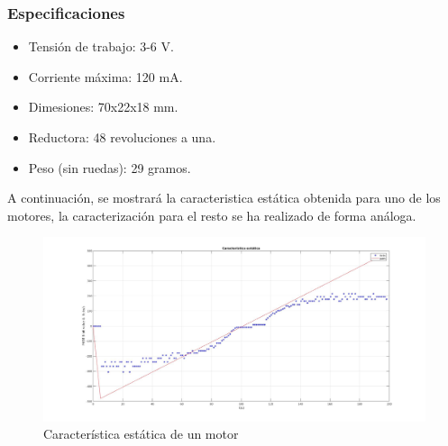 \subsubsection{Especificaciones}
\begin{itemize}
	\item Tensión de trabajo: 3-6 V.
	\item Corriente máxima: 120 mA.
	\item Dimesiones: 70x22x18 mm.
	\item Reductora: 48 revoluciones a una.
	\item Peso (sin ruedas): 29 gramos.
\end{itemize}

\newpage
A continuación, se mostrará la caracteristica estática obtenida para uno de los motores, la caracterización para el resto se ha realizado de forma análoga. 
\begin{figure}[h!]
	\centering
	\includegraphics[width=.6\textwidth]{images/hw/estatica}
	\caption{Característica estática de un motor}
\end{figure}


